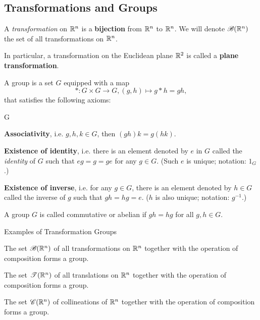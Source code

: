\subsection{Transformations and Groups}

\begin{definition}
    A \textit{transformation} on \(\mathbb{R}^n\) is a \textbf{bijection} from \(\mathbb{R}^n\) to \(\mathbb{R}^n\). We will denote \(\mathscr{B}(\mathbb{R}^n)\) the set of all transformations on \(\mathbb{R}^n\).

    In particular, a transformation on the Euclidean plane \(\mathbb{R}^2\) is called a \textbf{plane transformation}.
\end{definition}

\begin{definition}[Group]
    A group is a set \(G\) equipped with a map
    \[* : G \times G \to G, (g, h) \mapsto g * h = gh,\]
    that satisfies the following axioms:
    \begin{statements}{G}
        \item \label{item:G1} \textbf{Associativity}, i.e. \(g, h, k \in G\), then \((gh)k = g(hk)\).
        \item \textbf{Existence of identity}, i.e. there is an element denoted by \(e\) in \(G\) called the \textit{identity} of \(G\) such that \(eg = g = ge\) for any \(g \in G.\) (Such \(e\) is unique; notation: \(1_G\).)
        \item \textbf{Existence of inverse}, i.e. for any \(g \in G\), there is an element denoted by \(h \in G\) called the inverse of \(g\) such that \(gh = hg = e\). (\(h\) is also unique; notation: \(g^{-1}\).)
    \end{statements}
    A group \(G\) is called commutative or abelian if \(gh = hg\) for all \(g, h \in G\).
\end{definition}

\begin{proposition}
    Examples of Transformation Groups
    \begin{statements}{}
        \item The set \(\mathscr{B}(\mathbb{R}^n)\) of all transformations on \(\mathbb{R}^n\) together with the operation of composition forms a group.
        \item The set \(\mathscr{T}(\mathbb{R}^n)\) of all translations on \(\mathbb{R}^n\) together with the operation of composition forms a group.
        \item The set \(\mathscr{C}(\mathbb{R}^n)\) of collineations of \(\mathbb{R}^n\) together with the operation of composition forms a group.
    \end{statements}
\end{proposition}

